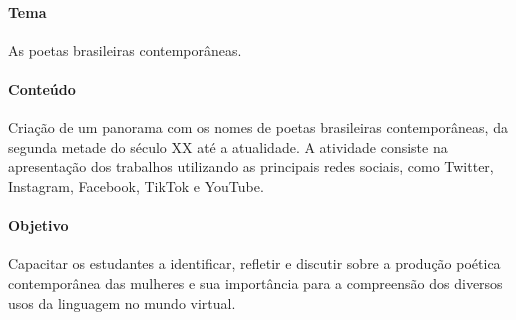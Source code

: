 \documentclass[12pt]{extarticle}
\begin{document}

\paragraph{Tema} As poetas brasileiras contemporâneas.

\paragraph{Conteúdo} Criação de um panorama com os nomes de poetas
brasileiras contemporâneas, da segunda metade do século XX até a
atualidade. A atividade consiste na apresentação dos trabalhos
utilizando as principais redes sociais, como Twitter, Instagram,
Facebook, TikTok e YouTube.

\paragraph{Objetivo} Capacitar os estudantes a identificar, refletir e
discutir sobre a produção poética contemporânea das mulheres e sua
importância para a compreensão dos diversos usos da linguagem no mundo
virtual.
\end{document}
